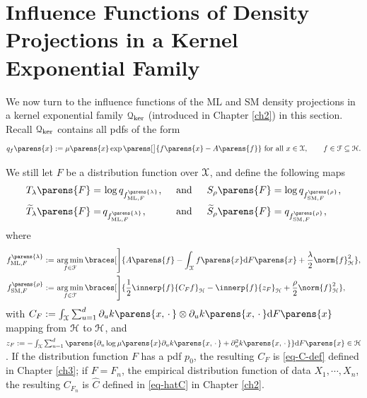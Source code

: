 \section{Influence Functions of Density Projections in a Kernel Exponential Family}\label{section-influence-function-kernel-exp-fam}

We now turn to the influence functions of the ML and SM density projections in a kernel exponential family $\mathcal{Q}_{\ker}$ (introduced in Chapter \ref{ch2}) in this section. Recall $\mathcal{Q}_{\ker}$ contains all pdfs of the form 
\begin{align*}
	q_{f} \parens{x} := \mu \parens{x} \exp \parens[\big]{f \parens{x} - A \parens{f}} \text{ for all } x \in \calX, \qquad f \in \calF \subseteq \calH. 
\end{align*}

We still let $F$ be a distribution function over $\mathcal{X}$, and define the following maps 
\begin{align*}
	T_{\lambda} \parens{F} = & \, \log q_{f_{\ML, F}^{\parens{\lambda}}},  && \, \text{ and }  && \, S_{\rho} \parens{F} = \log q_{f_{\SM, F}^{\parens{\rho}}}, \\ 
	\widetilde{T}_{\lambda} \parens{F} = & \, q_{f_{\ML, F}^{\parens{\lambda}}},  && \, \text{ and }  && \, \widetilde{S}_{\rho} \parens{F} = q_{f_{\SM, F}^{\parens{\rho}}}, 
\end{align*}
where 
\begin{align}
	f_{\ML, F}^{\parens{\lambda}} := & \, \argmin_{f \in \calF} \braces[\Bigg]{A \parens{f} - \int_{\calX} f \parens{x} \diff F \parens{x} + \frac{\lambda}{2} \norm{f}_{\calH}^2}, \label{eq-ml-obj-fun-general} \\ 
	f_{\SM, F}^{\parens{\rho}} := & \, \argmin_{f \in \calF} \braces[\Bigg]{\frac{1}{2} \innerp{f}{C_{F} f}_{\calH} - \innerp{f}{z_{F}}_{\calH} + \frac{\rho}{2} \norm{f}_{\calH}^2}, \label{eq-sm-obj-fun-general}
\end{align}
with $C_F := \int_{\calX} \sum_{u=1}^d \partial_u k \parens{x, \,\cdot\,} \otimes \partial_u k \parens{x, \,\cdot\,} \diff F \parens{x}$ mapping from $\mathcal{H}$ to $\mathcal{H}$, and $z_F := - \int_{\calX} \sum_{u=1}^d \parens{\partial_u \log \mu \parens{x} \partial_u k \parens{x, \,\cdot\,} + \partial_u^2 k \parens{x, \,\cdot\,}} \diff F \parens{x} \in \calH$. If the distribution function $F$ has a pdf $p_0$, the resulting $C_F$ is \eqref{eq-C-def} defined in Chapter \ref{ch3}; if $F = F_n$, the empirical distribution function of data $X_1, \cdots, X_n$, the resulting $C_{F_n}$ is $\widehat{C}$ defined in \eqref{eq-hatC} in Chapter \ref{ch2}. 

